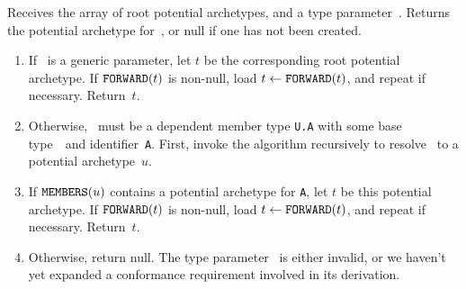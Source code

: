 \documentclass[../generics]{subfiles}
\begin{document}
\begin{algorithm}\label{archetype builder lookup} Receives the array of root potential archetypes, and a type parameter~\tT. Returns the potential archetype for~\tT, or null if one has not been created.
\begin{enumerate}
\item If \tT\ is a generic parameter, let $t$ be the corresponding root potential archetype. If $\texttt{FORWARD}(t)$ is non-null, load $t\leftarrow\texttt{FORWARD}(t)$, and repeat if necessary. Return~$t$.
\item Otherwise, \tT\ must be a dependent member type \texttt{U.A} with some base type~\tU\ and identifier~\texttt{A}. First, invoke the algorithm recursively to resolve \tU\ to a potential archetype~$u$.
\item If $\texttt{MEMBERS}(u)$ contains a potential archetype for \texttt{A}, let $t$ be this potential archetype. If $\texttt{FORWARD}(t)$ is non-null, load $t\leftarrow\texttt{FORWARD}(t)$, and repeat if necessary. Return~$t$.
\item Otherwise, return null. The type parameter \tT\ is either invalid, or we haven't yet expanded a conformance requirement involved in its derivation.
\end{enumerate}
\end{algorithm}
\end{document}
